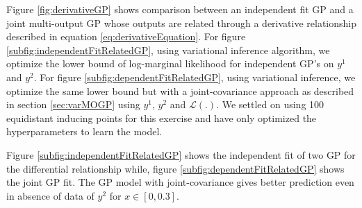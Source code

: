 Figure \ref{fig:derivativeGP} shows comparison between an independent fit GP and a joint multi-output GP whose outputs are related through a derivative relationship described in equation \ref{eq:derivativeEquation}. For figure \ref{subfig:independentFitRelatedGP}, using variational inference algorithm, we optimize the lower bound of log-marginal likelihood for independent GP's on \(y^{1}\) and \(y^{2}\). For figure \ref{subfig:dependentFitRelatedGP}, using variational inference, we optimize the same lower bound but with a joint-covariance approach as described in section \ref{sec:varMOGP} using \(y^{1}\), \(y^{2}\) and \(\mathcal{L}(.)\). We settled on using 100 equidistant inducing points for this exercise \cite{icpram16Ankit} and have only optimized the hyperparameters to learn the model. 

Figure \ref{subfig:independentFitRelatedGP} shows the independent fit of two GP for the differential relationship while, figure \ref{subfig:dependentFitRelatedGP} shows the joint GP fit. The GP model with joint-covariance gives better prediction even in absence of data of \(y^{2}\) for \(x \in [0, 0.3]\).


